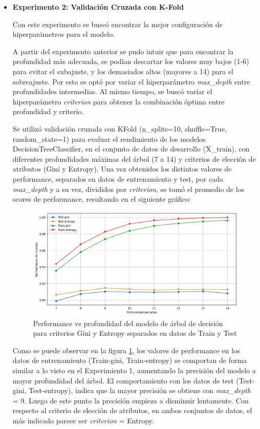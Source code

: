 \documentclass[11pt,a4paper, twocolumn]{article}
\begin{document}
\begin{itemize}
	\item[]
	\textbf{Experimento 2: Validación Cruzada con K-Fold }
 
Con este experimento se buscó encontrar la mejor configuración de hiperparámetros para el modelo. 

A partir del experimento anterior se pudo intuir que para encontrar la profundidad más adecuada, se podían descartar los valores muy bajos (1-6) para evitar el subajuste, y los demasiados altos (mayores a 14) para el sobreajuste. Por esto se optó por variar el hiperparámetro \textit{max\_depth} entre profundidades intermedias. 
Al mismo tiempo, se buscó variar el hiperparámetro \textit{criterion} para obtener la combinación óptima entre profundidad y criterio. 

Se utilizó validación cruzada con KFold (n\_splits=10, shuffle=True, random\_state=1) para evaluar el rendimiento de los modelos DecisionTreeClassifier, en el conjunto de datos de desarrollo (X\_train), con diferentes profundidades máximas del árbol (7 a 14) y criterios de elección de atributos (Gini y Entropy). Una vez obtenidos los distintos valores de performance, separados en datos de entrenamiento y test, por cada \textit{max\_depth} y a su vez, divididos por \textit{criterion}, se tomó el promedio de los scores de performance, resultando en el siguiente gráfico: 

\begin{figure}[H]
	\centering
	\includegraphics[scale=0.6]{figuras/3c.png}
	\caption{Performance vs profundidad del modelo de árbol de decisión para criterios Gini y Entropy separados en datos de Train y Test}
	\label{fig:3c}
\end{figure}

Como se puede observar en la figura \ref{fig:3c}, los valores de performance en los datos de entrenamiento (Train-gini, Train-entropy) se comportan de forma similar a lo visto en el Experimiento 1, aumentando la precisión del modelo a mayor profundidad del árbol. 
El comportamiento con los datos de test (Test-gini, Test-entropy), indica que la mayor precisión se obtiene con \textit{max\_depth} = 9. Luego de este punto la precisión empieza a disminuir lentamente. 
Con respecto al criterio de elección de atributos, en ambos conjuntos de datos, el más indicado parece ser \textit{criterion} = Entropy.
		

\end{itemize}
\end{document}
